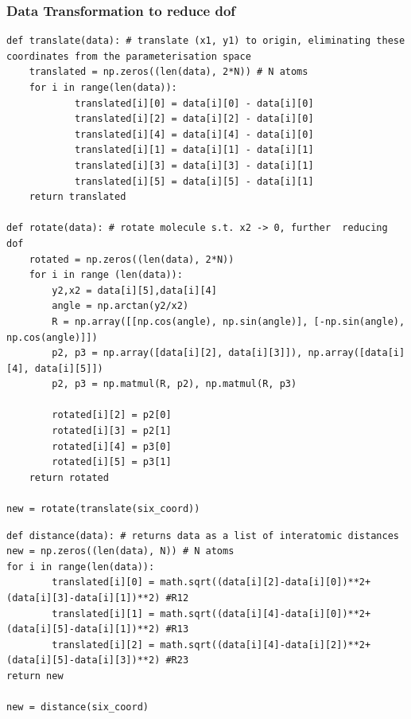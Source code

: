 \documentclass[12pt,a4paper]{article}
\begin{document}
\subsubsection{Data Transformation to reduce dof} \label{code:trans}
\begin{lstlisting}
def translate(data): # translate (x1, y1) to origin, eliminating these coordinates from the parameterisation space
    translated = np.zeros((len(data), 2*N)) # N atoms
    for i in range(len(data)):
            translated[i][0] = data[i][0] - data[i][0]
            translated[i][2] = data[i][2] - data[i][0]
            translated[i][4] = data[i][4] - data[i][0]
            translated[i][1] = data[i][1] - data[i][1]
            translated[i][3] = data[i][3] - data[i][1]
            translated[i][5] = data[i][5] - data[i][1]
    return translated

def rotate(data): # rotate molecule s.t. x2 -> 0, further  reducing dof
    rotated = np.zeros((len(data), 2*N))
    for i in range (len(data)):
        y2,x2 = data[i][5],data[i][4]
        angle = np.arctan(y2/x2)
        R = np.array([[np.cos(angle), np.sin(angle)], [-np.sin(angle), np.cos(angle)]])
        p2, p3 = np.array([data[i][2], data[i][3]]), np.array([data[i][4], data[i][5]])
        p2, p3 = np.matmul(R, p2), np.matmul(R, p3)
        
        rotated[i][2] = p2[0]
        rotated[i][3] = p2[1]
        rotated[i][4] = p3[0]
        rotated[i][5] = p3[1]
    return rotated
    
new = rotate(translate(six_coord))
\end{lstlisting}
\begin{lstlisting}
def distance(data): # returns data as a list of interatomic distances
new = np.zeros((len(data), N)) # N atoms
for i in range(len(data)):
        translated[i][0] = math.sqrt((data[i][2]-data[i][0])**2+(data[i][3]-data[i][1])**2) #R12
        translated[i][1] = math.sqrt((data[i][4]-data[i][0])**2+(data[i][5]-data[i][1])**2) #R13
        translated[i][2] = math.sqrt((data[i][4]-data[i][2])**2+(data[i][5]-data[i][3])**2) #R23
return new

new = distance(six_coord)
\end{lstlisting}{}
\end{document}
